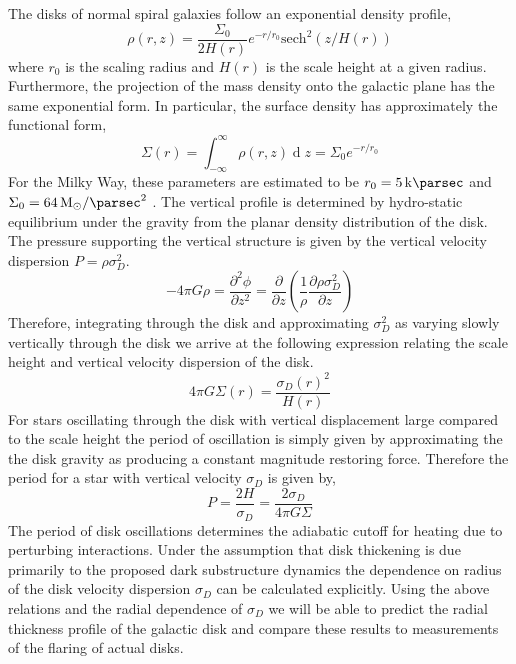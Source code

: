 \documentclass[usenatbib]{mnras}
\renewcommand{\d}[1]{\! \mathrm{d}#1 \:}
\newcommand{\pderiv}[2]{\frac{\partial{#1}}{\partial{#2}}}
\renewcommand{\d}[1]{\ensuremath{\operatorname{d}\!{#1}}}
\begin{document}
\par
The disks of normal spiral galaxies follow an exponential density profile,
\begin{equation}
\rho(r, z) = \frac{\Sigma_0}{2 H(r)} e^{-r/r_0} \mathrm{sech}^2{(z/H(r))} 
\end{equation}
where $r_0$ is the scaling radius and $H(r)$ is the scale height at a given radius. Furthermore, the projection of the mass density onto the galactic plane has the same exponential form. In particular, the surface density has approximately the functional form,
\begin{equation}
\Sigma(r) = \int_{-\infty}^{\infty} \rho(r, z) \d{z} = \Sigma_0 e^{-r / r_0}
\end{equation}
For the Milky Way, these parameters are estimated to be $r_0 = \SI{5}{\kilo \parsec}$ and $\Sigma_0 = \SI{64}{M_{\odot} \per \parsec \squared}$ \citep{dynamical_measurement}. The vertical profile is determined by hydro-static equilibrium under the gravity from the planar density distribution of the disk. The pressure supporting the vertical structure is given by the vertical velocity dispersion $P = \rho \sigma_D^2$. 
\begin{equation}
- 4 \pi G \rho = \frac{\partial^2 \phi}{\partial z^2} = \pderiv{}{z} \left( \frac{1}{\rho} \pderiv{ \rho \sigma_D^2}{z} \right)
\end{equation}  
Therefore, integrating through the disk and approximating $\sigma_D^2$ as varying slowly vertically through the disk we arrive at the following expression relating the scale height and vertical velocity dispersion of the disk.
\begin{equation} \label{scale}
4 \pi G \Sigma(r) = \frac{ \sigma_D(r)^2 }{H(r)}
\end{equation}
For stars oscillating through the disk with vertical displacement large compared to the scale height the period of oscillation is simply given by approximating the the disk gravity as producing a constant magnitude restoring force. Therefore the period for a star with vertical velocity $\sigma_D$ is given by,
\begin{equation}
P = \frac{2 H}{\sigma_D} = \frac{2 \sigma_D}{4 \pi G \Sigma}
\end{equation}
The period of disk oscillations determines the adiabatic cutoff for heating due to perturbing interactions. Under the assumption that disk thickening is due primarily to the proposed dark substructure dynamics the dependence on radius of the disk velocity dispersion $\sigma_D$ can be calculated explicitly. Using the above relations and the radial dependence of $\sigma_D$ we will be able to predict the radial thickness profile of the galactic disk and compare these results to measurements of the flaring of actual disks.  
\end{document}
